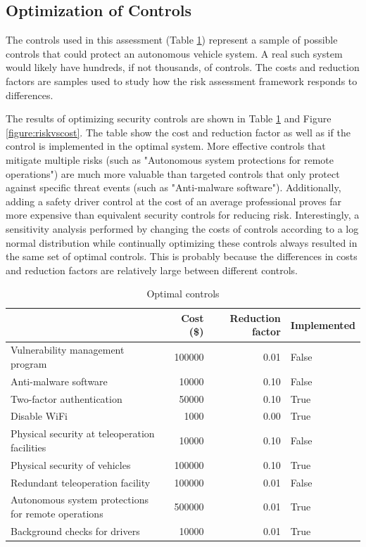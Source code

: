 \documentclass{article}
\begin{document}
\subsection{Optimization of Controls}
The controls used in this assessment (Table \ref{table:optimal_controls}) represent a sample of possible controls that could protect an autonomous vehicle system. A real such system would likely have hundreds, if not thousands, of controls. The costs and reduction factors are samples used to study how the risk assessment framework responds to differences.

The results of optimizing security controls are shown in Table \ref{table:optimal_controls} and Figure \ref{figure:riskvscost}. The table show the cost and reduction factor as well as if the control is implemented in the optimal system. More effective controls that mitigate multiple risks (such as "Autonomous system protections for remote operations") are much more valuable than targeted controls that only protect against specific threat events (such as "Anti-malware software"). Additionally, adding a safety driver control at the cost of an average professional proves far more expensive than equivalent security controls for reducing risk. Interestingly, a sensitivity analysis performed by changing the costs of controls according to a log normal distribution while continually optimizing these controls always resulted in the same set of optimal controls. This is probably because the differences in costs and reduction factors are relatively large between different controls.

\begin{table}[h]\begin{center}
\begin{tabular}{l | r | r | l}
{}  &    Cost (\$) & Reduction factor  & Implemented  \\
\hline
Vulnerability management program                    &  100000 &  0.01& False  \\
Anti-malware software                               &  10000 & 0.10  & False \\
Two-factor authentication                           &  50000 & 0.10  & True \\
Disable WiFi                                        &  1000 & 0.00  &True  \\
Physical security at teleoperation facilities       &  10000 &0.10   & False \\
Physical security of vehicles                       &  100000 &0.10   &  True\\
Redundant teleoperation facility                    &  100000 &  0.01 & False \\
Autonomous system protections for remote operations &  500000 &0.01   & True \\
Background checks for drivers                       &  10000 & 0.01  & True \\
\end{tabular}
    \caption{Optimal controls}
    \label{table:optimal_controls}
\end{center} \end{table}
\end{document}
